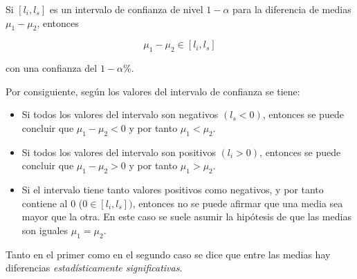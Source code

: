 \documentclass[
  a4paper,
]{scrreport}
\providecommand{\tightlist}{%
  \setlength{\itemsep}{0pt}\setlength{\parskip}{0pt}}\usepackage{longtable,booktabs,array}
\theoremstyle{plain}
\theoremstyle{definition}
\theoremstyle{definition}
\theoremstyle{remark}
\begin{document}
Si \([l_i,l_s]\) es un intervalo de confianza de nivel \(1-\alpha\) para
la diferencia de medias \(\mu_1-\mu_2\), entonces

\[
\mu_1-\mu_2 \in [l_i,l_s]
\]

con una confianza del \(1-\alpha\%\).

Por consiguiente, según los valores del intervalo de confianza se tiene:

\begin{itemize}
\tightlist
\item
  Si todos los valores del intervalo son negativos \((l_s<0)\), entonces
  se puede concluir que \(\mu_1-\mu_2<0\) y por tanto \(\mu_1<\mu_2\).
\item
  Si todos los valores del intervalo son positivos \((l_i>0)\), entonces
  se puede concluir que \(\mu_1-\mu_2>0\) y por tanto \(\mu_1>\mu_2\).
\item
  Si el intervalo tiene tanto valores positivos como negativos, y por
  tanto contiene al 0 (\(0\in [l_i,l_s])\), entonces no se puede afirmar
  que una media sea mayor que la otra. En este caso se suele asumir la
  hipótesis de que las medias son iguales \(\mu_1=\mu_2\).
\end{itemize}

Tanto en el primer como en el segundo caso se dice que entre las medias
hay diferencias \emph{estadísticamente significativas}.
\end{document}
